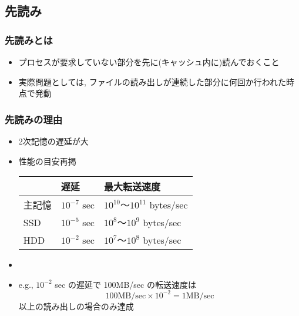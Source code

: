 \documentclass[12pt,dvipdfmx]{beamer}
\begin{document}
\subsection{先読み}

\begin{frame}
  \frametitle{先読みとは}
  \begin{itemize}
  \item プロセスが要求していない部分を先に(キャッシュ内に)読んでおくこと
  \item 実際問題としては, ファイルの読み出しが連続した部分に何回か行われた時点で発動
  \end{itemize}
\end{frame}

\begin{frame}
  \frametitle{先読みの理由}
  \begin{itemize}
  \item<1-> 2次記憶の遅延が大
  \item<1-> 性能の目安再掲

    {\small\begin{tabular}{|l|l|l|}\hline
             & 遅延     & 最大転送速度    \\\hline
      主記憶 & $10^{-7}$ sec & $10^{10}$〜$10^{11}$ bytes/sec \\
      SSD    & $10^{-5}$ sec & $10^{8}$〜$10^{9}$ bytes/sec \\
      HDD    & $10^{-2}$ sec & $10^{7}$〜$10^{8}$ bytes/sec \\\hline
    \end{tabular}}
  \item<2-> 
  \item<4-> e.g., $10^{-2}$ sec の遅延で 100MB/sec の転送速度は
    \[ 100 \mbox{MB/sec} \times 10^{-2} = 1 \mbox{MB/sec} \]
    以上の読み出しの場合のみ達成
  \end{itemize}

  \begin{center}
  \end{center}
\end{frame}
\end{document}

